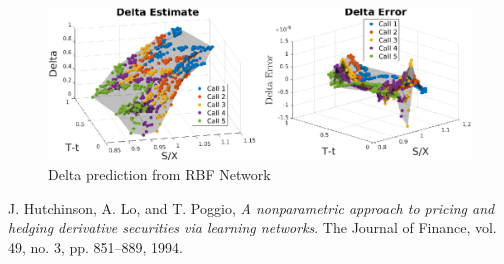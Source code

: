 \documentclass[11pt, fleqn]{article}
\begin{document}
\begin{figure}[!h]
\begin{center}
	\includegraphics[scale=.65] {q1_rbf_delta.eps}
	\caption{Delta prediction from RBF Network}
	\label{fig:q1-rbf-delta}
\end{center}
\end{figure}

\begin{thebibliography}{9}
J. Hutchinson, A. Lo, and T. Poggio,
\textit{A nonparametric  approach  to  pricing  and  hedging  derivative
securities via learning networks}. 
The Journal of Finance, vol. 49, no. 3, pp. 851–889, 1994.

\end{thebibliography}
\end{document}
